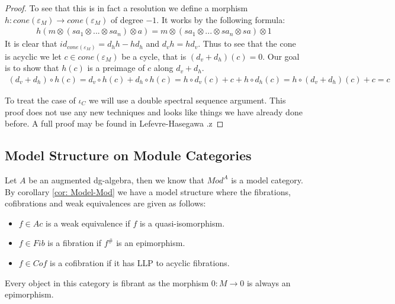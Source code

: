 \documentclass[../thesis.tex]{subfiles}
\begin{document}
\begin{proof}
                To see that this is in fact a resolution we define a morphism $h : cone(\varepsilon_M) \rightarrow cone(\varepsilon_M)$ of degree $-1$. It works by the following formula:
                \begin{align*}
                    h(m \otimes (sa_1 \otimes ... \otimes sa_n) \otimes a) = m \otimes (sa_1 \otimes ... \otimes sa_n \otimes sa) \otimes 1
                \end{align*}
                It is clear that $id_{cone(\varepsilon_M)} = d_hh - hd_h$ and $d_vh = hd_v$. Thus to see that the cone is acyclic we let $c\in cone(\varepsilon_M)$ be a cycle, that is $(d_v + d_h)(c) = 0$. Our goal is to show that $h(c)$ is a preimage of $c$ along $d_v + d_h$.
                \begin{multline*}
                    (d_v + d_h)\circ h(c) = d_v\circ h(c) + d_h\circ h(c) = h\circ d_v(c) + c + h\circ d_h(c) = h\circ (d_v + d_h)(c) + c = c
                \end{multline*}

                To treat the case of $\iota_C$ we will use a double spectral sequence argument. This proof does not use any new techniques and looks like things we have already done before. A full proof may be found in Lefevre-Hasegawa \cite{LefevreHasegawa03}.z

            \end{proof}

        \subsection{Model Structure on Module Categories}

            Let $A$ be an augmented dg-algebra, then we know that $Mod^A$ is a model category. By corollary \ref{cor: Model-Mod} we have a model structure where the fibrations, cofibrations and weak equivalences are given as follows:
            \begin{itemize}
                \item $f\in Ac$ is a weak equivalence if $f$ is a quasi-isomorphism.
                \item $f\in Fib$ is a fibration if $f^\#$ is an epimorphism.
                \item $f\in Cof$ is a cofibration if it has LLP to acyclic fibrations. 
            \end{itemize}

            Every object in this category is fibrant as the morphism $0 : M \rightarrow 0$ is always an epimorphism.
\end{document}
